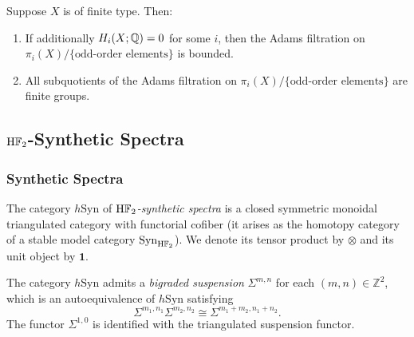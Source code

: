 \begin{axiom}\label{prereq:ax:adams-boundedness}
    Suppose $X$ is of finite type. Then:
    \begin{enumerate}
        \item If additionally $H_i(X; {\mathbb Q}) = 0$ for some $i$, then the Adams filtration on $\pi_i(X) / \{\text{odd-order elements}\}$ is bounded.
        \item All subquotients of the Adams filtration on $\pi_i(X) / \{\text{odd-order elements}\}$ are finite groups.
    \end{enumerate}
\end{axiom}


\subsection{$\mathrm{H}{\mathbb F}_2$-Synthetic Spectra}\label{sec:prereq-synthetic}

\subsubsection{Synthetic Spectra}\label{sec:prereq-syn-basic}

\begin{definition}\label{prereq:def:synthetic-category}
    \leanok
    The category $h\mathrm{Syn}$ of \emph{$\mathrm{H}{\mathbb F}_2$-synthetic spectra} is a closed symmetric monoidal triangulated category with functorial cofiber (it arises as the homotopy category of a stable model category $\mathrm{Syn}_{\mathrm{H}{\mathbb F}_2}$). We denote its tensor product by $\otimes$ and its unit object by $\mathbf{1}$.
\end{definition}

\begin{definition}\label{prereq:def:bigraded-suspension}
    The category $h\mathrm{Syn}$ admits a \emph{bigraded suspension} $\Sigma^{m,n}$ for each $(m,n) \in \mathbb{Z}^2$, which is an autoequivalence of $h\mathrm{Syn}$ satisfying
    $$\Sigma^{m_1,n_1}\Sigma^{m_2,n_2} \cong \Sigma^{m_1+m_2, n_1+n_2}.$$
    The functor $\Sigma^{1,0}$ is identified with the triangulated suspension functor.
\end{definition}

